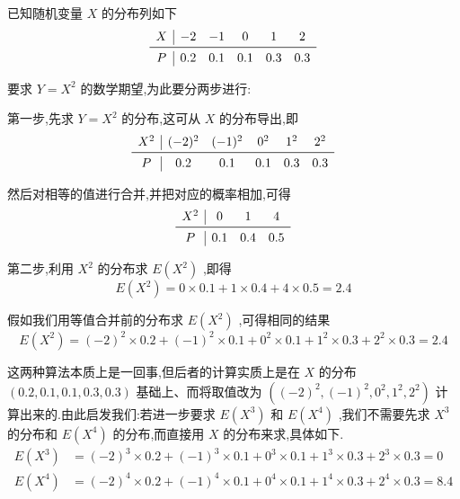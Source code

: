\begin{example}\label{exam:2.2.6}
	已知随机变量 $ X $ 的分布列如下
	\[
	\begin{array}{c|ccccc}
	X &{-2} & {-1} & {0} & {1} & {2} \\ \midrule
	P & {0.2} & {0.1} & {0.1} & {0.3} & {0.3}
	\end{array}
	\]
	
	要求 $ Y=X^2 $ 的数学期望,为此要分两步进行:
	
	第一步,先求 $ Y=X^2 $ 的分布,这可从 $ X $ 的分布导出,即
	\[
	\begin{array}{c|ccccc}
	X^2    & (-2)^2 & (-1)^2 & 0^2    & 1^2    & 2^2 \\\midrule
	P     & 0.2   & 0.1   & 0.1   & 0.3   & 0.3 \\
	\end{array}
	\]
	
	然后对相等的值进行合并,并把对应的概率相加,可得
	\[
	\begin{array}{c|ccc}
	X^2    & 0     & 1     & 4 \\\midrule
	P     & 0.1   & 0.4   & 0.5 \\
	\end{array}
	\]
	
	第二步,利用 $ X^2 $ 的分布求 $ E(X^2) $ ,即得
	\[
	E\left(X^{2}\right)=0 \times 0.1+1 \times 0.4+4 \times 0.5=2.4
	\]
	
	假如我们用等值合并前的分布求 $ E(X^2) $ ,可得相同的结果
	\[
	E\left(X^{2}\right)=(-2)^{2} \times 0.2+(-1)^{2} \times 0.1+0^{2} \times 0.1+1^{2} \times 0.3+2^{2} \times 0.3=2.4
	\]
	
	这两种算法本质上是一回事,但后者的计算实质上是在 $ X $ 的分布 $ (0.2,
	0.1,0.1,0.3,0.3) $ 基础上、而将取值改为 $ \left((-2)^{2},(-1)^{2}, 0^{2}, 1^{2}, 2^{2}\right) $ 计算出来的.由此启发我们:若进一步要求 $ E(X^3) $ 和 $ E(X^4) $ ,我们不需要先求 $ X^3 $ 的分布和 $ E\left(X^{4}\right) $ 的分布,而直接用 $ X $ 的分布来求,具体如下.
	\[
	\begin{aligned} 
	E\left(X^{3}\right) &=(-2)^{3} \times 0.2+(-1)^{3} \times 0.1+0^{3} \times 0.1+1^{3} \times 0.3+2^{3} \times 0.3=0 \\ E\left(X^{4}\right) &=(-2)^{4} \times 0.2+(-1)^{4} \times 0.1+0^{4} \times 0.1+1^{4} \times 0.3+2^{4} \times 0.3=8.4 
	\end{aligned}
	\]
	
\end{example}



